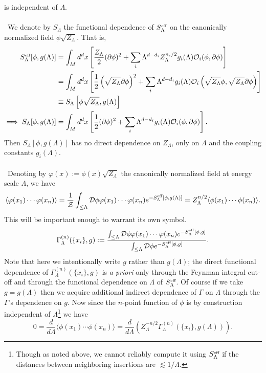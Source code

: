 \documentclass[11pt,letterpaper]{article}
\newcommand{\LP}{\left(}
\newcommand{\RP}{\right)}
\newcommand{\mc}[1]{\mathcal{#1}}
\newcommand{\D}{\partial}
\begin{document}
is independent of $\Lambda$. \\
\\
\
We denote by $S_\Lambda$ the functional dependence of $S_\Lambda^{\mbox{\tiny{eff}}}$ on the canonically normalized field $\phi \sqrt{Z_\Lambda}$. That is, \begin{equation}
\begin{aligned}
S_\Lambda^{\mbox{\tiny{eff}}}[\phi, g(\Lambda)] & = \int_M d^d x \left[ \frac{Z_\Lambda}{2} (\D \phi)^2 + \sum_i \Lambda^{d - d_i} Z_\Lambda^{n_i / 2} g_i (\Lambda) \mc{O}_i( \phi, \D \phi) \right] \\
& = \int_M d^d x \left[ \frac{1}{2} \LP \sqrt{Z_\Lambda} \D \phi \RP^2 + \sum_i \Lambda^{d - d_i} g_i (\Lambda) \mc{O}_i \LP \sqrt{Z_\Lambda} \phi, \sqrt{Z_\Lambda} \D \phi \RP \right] \\
& \equiv S_\Lambda \left[ \phi \sqrt{Z_\Lambda}, g(\Lambda) \right] \\
\implies S_\Lambda[\phi, g(\Lambda)] & = \int_M d^d x \left[ \frac{1}{2} (\D \phi)^2 + \sum_i \Lambda^{d - d_i} g_i (\Lambda) \mc{O}_i( \phi, \D \phi) \right].
\end{aligned}
\end{equation}
Then $S_\Lambda[\phi, g(\Lambda)]$ has no direct dependence on $Z_\Lambda$, only on $\Lambda$ and the coupling constants $g_i(\Lambda)$. \\
\\
\
Denoting by $\varphi(x) := \phi(x) \sqrt{Z_\Lambda}$ the canonically normalized field at energy scale $\Lambda$, we have \begin{equation}
\langle \varphi(x_1) \cdots \varphi(x_n) \rangle = \frac{1}{\mc{Z}} \int_{\leq \Lambda} \mc{D} \phi \varphi(x_1) \cdots \varphi(x_n) e^{- S_\Lambda^{\mbox{\tiny{eff}}}[\phi, g(\Lambda)]} = Z_\Lambda^{n/2} \langle \phi(x_1) \cdots \phi(x_n) \rangle.
\end{equation}
This will be important enough to warrant its own symbol. \begin{equation}
\Gamma_\Lambda^{(n)}( \{x_i\}, g) := \frac{\int_{\leq \Lambda} \mc{D} \phi \varphi(x_1) \cdots \varphi(x_n) e^{- S_\Lambda^{\mbox{\tiny{eff}}}[\phi, g]}}{\int_{\leq \Lambda} \mc{D} \phi e^{- S_\Lambda^{\mbox{\tiny{eff}}}[\phi, g]}}.
\end{equation}
Note that here we intentionally write $g$ rather than $g(\Lambda)$; the direct functional dependence of $\Gamma_\Lambda^{(n)}( \{x_i\}, g)$ is \textit{a priori} only through the Feynman integral cut-off and through the functional dependence on $\Lambda$ of $S_\Lambda^{\mbox{\tiny{eff}}}$. Of course if we take $g = g(\Lambda)$ then we acquire additional indirect dependence of $\Gamma$ on $\Lambda$ through the $\Gamma$'s dependence on $g$. Now since the $n$-point function of $\phi$ is by construction independent of $\Lambda$\footnote{Though as noted above, we cannot reliably compute it using $S_\Lambda^{\mbox{\tiny{eff}}}$ if the distances between neighboring insertions are $\lesssim 1/\Lambda$.} we have \begin{equation}
0 = \frac{d}{d \Lambda} \langle \phi(x_1) \cdots \phi(x_n) \rangle = \frac{d}{d \Lambda} \LP Z_\Lambda^{-n/2} \Gamma_\Lambda^{(n)}( \{x_i\}, g(\Lambda)) \RP.
\end{equation}
\end{document}

